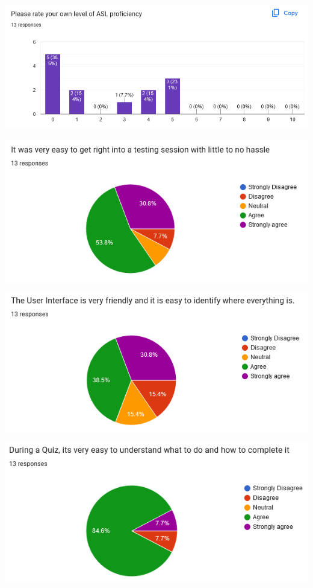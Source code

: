 \documentclass[12pt, titlepage]{article}
\begin{document}
\vspace{0.5cm}
\centering
\includegraphics[scale=0.75]{Usability Survey Results/Q1.png}

\newpage

\vspace{0.5cm}
\centering
\includegraphics[scale=0.8]{Usability Survey Results/Q2.png}

\vspace{0.5cm}
\centering
\includegraphics[scale=0.8]{Usability Survey Results/Q3.png}

\vspace{0.5cm}
\centering
\includegraphics[scale=0.8]{Usability Survey Results/Q4.png}
\end{document}
